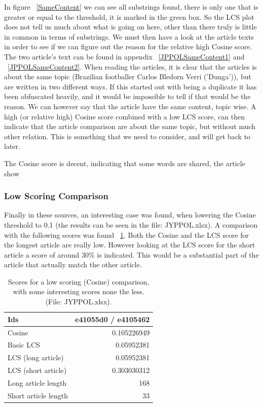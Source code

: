 In figure ~\ref{SameContent} we can see all substrings found, there is only one that is greater or equal to the threshold, it is marked in the green box. So the LCS plot does not tell us much about what is going on here, other than there truly is little in common in terms of substrings. We must then have a look at the article texts in order to see if we can figure out the reason for the relative high Cosine score. The two article's text can be found in appendix ~\ref{JPPOLSameContent1} and ~\ref{JPPOLSameContent2}. When reading the articles, it is clear that the articles is about the same topic (Brazilian footballer Carlos Bledorn Verri ('Dunga')), but are written in two different ways. If this started out with being a duplicate it has been obfuscated heavily, and it would be impossible to tell if that would be the reason. We can however say that the article have the same content, topic wise. A high (or relative high) Cosine score combined with a low LCS score, can then indicate that the article comparison are about the same topic, but without much other relation. This is something that we need to consider, and will get back to later.

The Cosine score is decent, indicating that some words are shared, the article show

\subsubsection{Low Scoring Comparison}
Finally in these sources, an interesting case was found, when lowering the Cosine threshold to 0.1 (the results can be seen in the file: JYPPOL.xlsx). A comparison with the following scores was found ~\ref{JPPOLLowScoreMatch}. Both the Cosine and the LCS score for the longest article are really low. However looking at the LCS score for the short article a score of around 30\% is indicated. This would be a substantial part of the article that actually match the other article.

\begin{table}
\begin{center}
	\begin{tabular}{l | r}
	Ids & e41055d0 / e4105462\\ \hline
	Cosine & 0.105226949\\ \hline
	Basic LCS & 0.05952381\\ \hline
	LCS (long article) & 0.05952381\\ \hline
	LCS (short article) & 0.303030312\\ \hline
	Long article length & 168\\ \hline
	Short article length & 33\\ \hline	
	\end{tabular}
\end{center}
\caption{Scores for a low scoring (Cosine) comparison, with some interesting scores none the less. (File: JYPPOL.xlsx).}
\label{JPPOLLowScoreMatch}
\end{table}

